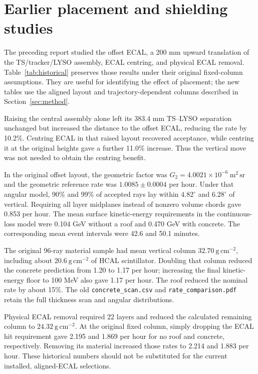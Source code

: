 \section{Earlier placement and shielding studies}
\label{app:previous}
The preceding report studied the offset ECAL, a 200 mm upward translation
of the TS/tracker/LYSO assembly, ECAL centring, and physical ECAL removal.
Table~\ref{tab:historical} preserves those results under their original
fixed-column assumptions. They are useful for identifying the effect of
placement; the new tables use the aligned layout and trajectory-dependent
columns described in Section~\ref{sec:method}.


Raising the central assembly alone left its 383.4 mm TS--LYSO separation
unchanged but increased the distance to the offset ECAL, reducing the rate
by 10.2\%. Centring ECAL in that raised layout recovered acceptance, while
centring it at the original heights gave a further 11.0\% increase. Thus the
vertical move was not needed to obtain the centring benefit.

In the original offset layout, the geometric factor was
$G_2=4.0021\times10^{-6}\ \mathrm{m^2\,sr}$ and the geometric reference rate was
$1.0085\pm0.0004$ per hour. Under that angular model, 90\% and 99\% of accepted
rays lay within $4.82^\circ$ and $6.28^\circ$ of vertical. Requiring all layer
midplanes instead of nonzero volume chords gave 0.853 per hour. The mean
surface kinetic-energy requirements in the continuous-loss model were
0.104 GeV without a roof and 0.470 GeV with concrete. The corresponding
mean event intervals were 42.6 and 50.1 minutes.

The original 96-ray material sample had mean vertical column
$32.70\ \mathrm{g\,cm^{-2}}$, including about $20.6\ \mathrm{g\,cm^{-2}}$ of HCAL
scintillator. Doubling that column reduced the concrete prediction from
1.20 to 1.17 per hour; increasing the final kinetic-energy floor to 100 MeV
also gave 1.17 per hour. The roof reduced the nominal rate by about 15\%.
The old \texttt{concrete\_scan.csv} and \texttt{rate\_comparison.pdf} retain the
full thickness scan and angular distributions.

Physical ECAL removal required 22 layers and reduced the calculated remaining
column to $24.32\ \mathrm{g\,cm^{-2}}$. At the original fixed column, simply
dropping the ECAL hit requirement gave 2.195 and 1.869 per hour for no roof
and concrete, respectively. Removing its material increased those rates
to 2.214 and 1.883 per hour. These historical numbers should not be substituted
for the current installed, aligned-ECAL selections.

